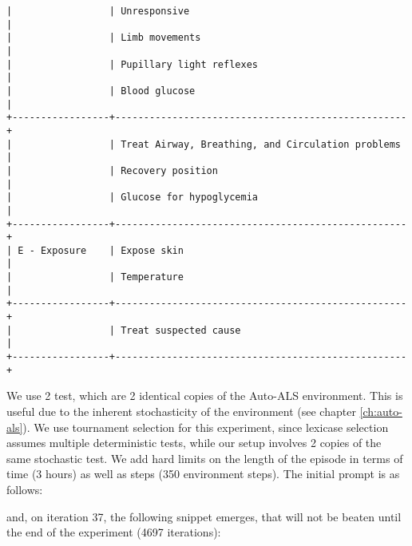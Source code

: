 \begin{lstlisting}
|                 | Unresponsive                                      |
|                 | Limb movements                                    |
|                 | Pupillary light reflexes                          |
|                 | Blood glucose                                     |
+-----------------+---------------------------------------------------+
|                 | Treat Airway, Breathing, and Circulation problems |
|                 | Recovery position                                 |
|                 | Glucose for hypoglycemia                          |
+-----------------+---------------------------------------------------+
| E - Exposure    | Expose skin                                       |
|                 | Temperature                                       |
+-----------------+---------------------------------------------------+
|                 | Treat suspected cause                             |
+-----------------+---------------------------------------------------+
\end{lstlisting}

We use 2 test, which are 2 identical copies of the Auto-ALS environment.
This is useful due to the inherent stochasticity of the environment (see chapter \ref{ch:auto-als}).
We use tournament selection for this experiment, since lexicase selection assumes multiple deterministic tests, while our setup involves 2 copies of the same stochastic test.
We add hard limits on the length of the episode in terms of time (3 hours) as well as steps (350 environment steps).
The initial prompt is as follows:



and, on iteration 37, the following snippet emerges, that will not be beaten until the end of the experiment (4697 iterations):


